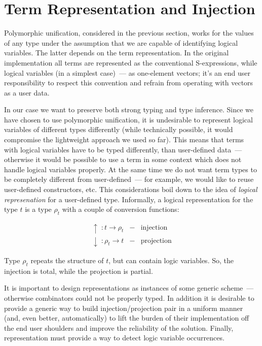 \section{Term Representation and Injection}
\label{sec:injection}

Polymorphic unification, considered in the previous section, works for the values of any type under the assumption that we
are capable of identifying logical variables. The latter depends on the term representation. In the original
implementation all terms are represented as the conventional S-expressions, while logical variables (in a simplest case)~--- as one-element vectors; it's an end user responsibility to respect this convention and refrain from operating 
with vectors as a user data.

In our case we want to preserve both strong typing and type inference. Since we have chosen to use polymorphic 
unification, it is undesirable to represent logical variables of different types differently (while technically 
possible, it would compromise the lightweight approach we used so far). This means that terms with logical
variables have to be typed differently, than user-defined data~--- otherwise it would be possible to use
a term in some context which does not handle logical variables properly. At the same time we do not want term types
to be completely different from user-defined~--- for example, we would like to reuse user-defined constructors, etc.
This considerations boil down to the idea of \emph{logical represenation} for a user-defined type. Informally, 
a logical representation for the type $t$ is a type $\rho_t$ with a couple of conversion functions:
    
$$
\begin{array}{rcl}
   \uparrow  \;: t \to \rho_t & - & \mbox{injection}\\
   \downarrow\;: \rho_t \to t & - & \mbox{projection}
\end{array}
$$

Type $\rho_t$ repeats the structure of $t$, but can contain logic variables. So, the injection is total, 
while the projection is partial. 

It is important to design representations as instances of some generic scheme~--- otherwise \miniKanren combinators
could not be properly typed. In addition it is desirable to provide a generic way to build
injection/projection pair in a uniform manner (and, even better, automatically) to lift the burden of
their implementation off the end user shoulders and improve the reliability of the solution. Finally,
representation must provide a way to detect logic variable occurrences. 



